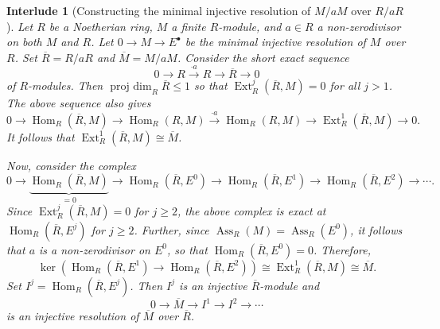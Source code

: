 \documentclass[10pt]{article}
\theoremstyle{thmstyle}
\theoremstyle{defstyle}
\newtheorem{interlude}[theorem]{Interlude}
\newcommand{\Hom}{\operatorname{Hom}}
\renewcommand{\le}{\leqslant}
\renewcommand{\ge}{\geqslant}
\newcommand{\Ext}{\operatorname{Ext}}
\newcommand{\Ass}{\operatorname{Ass}}
\newcommand{\projdim}{\operatorname{proj~dim}}
\begin{document}
\begin{interlude}[Constructing the minimal injective resolution of $M/aM$ over $R/aR$]\hfill
    
    \noindent Let $R$ be a Noetherian ring, $M$ a finite $R$-module, and $a\in R$ a non-zerodivisor on both $M$ and $R$. Let $0\to M\to E^\bullet$ be the minimal injective resolution of $M$ over $R$. Set $\overline R = R/aR$ and $\overline M = M/aM$. Consider the short exact sequence
    \begin{equation*}
        0\to R\xrightarrow{\cdot a} R\to\overline R\to 0
    \end{equation*}
    of $R$-modules. Then $\projdim_R\overline R\le 1$ so that $\Ext^j_R(\overline R, M) = 0$ for all $j > 1$. The above sequence also gives 
    \begin{equation*}
        0\to\Hom_R(\overline R, M)\to\Hom_R(R, M)\xrightarrow{\cdot a}\Hom_R(R, M)\to\Ext^1_R(\overline R, M)\to 0.
    \end{equation*}
    It follows that $\Ext^1_R(\overline R, M)\cong\overline M$.

    Now, consider the complex 
    \begin{equation*}
        0\to\underbrace{\Hom_R(\overline R, M)}_{= 0}\to\Hom_R(\overline R, E^0)\to\Hom_R(\overline R, E^1)\to\Hom_R(\overline R, E^2)\to\cdots.
    \end{equation*}
    Since $\Ext^j_R(\overline R, M) = 0$ for $j\ge 2$, the above complex is exact at $\Hom_R(\overline R, E^j)$ for $j\ge 2$. Further, since $\Ass_R(M) = \Ass_R(E^0)$, it follows that $a$ is a non-zerodivisor on $E^0$, so that $\Hom_R(\overline R, E^0) = 0$. Therefore, 
    \begin{equation*}
        \ker\left(\Hom_R(\overline R, E^1)\to\Hom_R(\overline R, E^2)\right)\cong\Ext^1_R(\overline R, M)\cong\overline M.
    \end{equation*}
    Set $I^j = \Hom_R(\overline R, E^j)$. Then $I^j$ is an injective $\overline R$-module and 
    \begin{equation*}
        0\to \overline M\to I^1\to I^2\to\cdots
    \end{equation*}
    is an injective resolution of $\overline M$ over $\overline R$.


\end{interlude}
\end{document}

